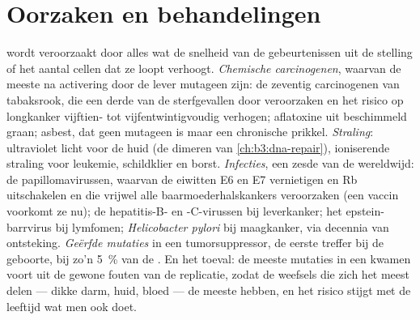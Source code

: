 \section{Oorzaken en behandelingen}

\begin{proposition}[Oorzaken]\label{prop:b3:cancer-biology:causes}
 wordt veroorzaakt door alles wat de snelheid van de
gebeurtenissen uit de stelling of het aantal cellen dat ze loopt
verhoogt. \emph{Chemische carcinogenen}, waarvan de meeste na
activering door de lever mutageen zijn: de zeventig carcinogenen van
tabaksrook, die een derde van de sterfgevallen door  veroorzaken
en het risico op longkanker vijftien- tot vijfentwintigvoudig verhogen;
aflatoxine uit beschimmeld graan; asbest, dat geen mutageen is maar een
chronische prikkel. \emph{Straling}: ultraviolet licht voor de huid (de
dimeren van \cref{ch:b3:dna-repair}), ioniserende straling voor
leukemie, schildklier en borst. \emph{Infecties}, een zesde van de
 wereldwijd: de papillomavirussen, waarvan de eiwitten E6 en E7
 vernietigen en Rb uitschakelen en die vrijwel alle
baarmoederhalskankers veroorzaken (een vaccin voorkomt ze nu); de
hepatitis-B- en -C-virussen bij leverkanker; het epstein-barrvirus bij
lymfomen; \emph{Helicobacter pylori} bij maagkanker, via decennia van
ontsteking. \emph{Geërfde mutaties} in een tumorsuppressor, de eerste
treffer bij de geboorte, bij zo'n \qty{5}{\%} van de . En het
toeval: de meeste mutaties in een  kwamen voort uit de gewone
fouten van de replicatie, zodat de weefsels die zich het meest delen
--- dikke darm, huid, bloed --- de meeste  hebben, en het risico
stijgt met de leeftijd wat men ook doet.
\end{proposition}

